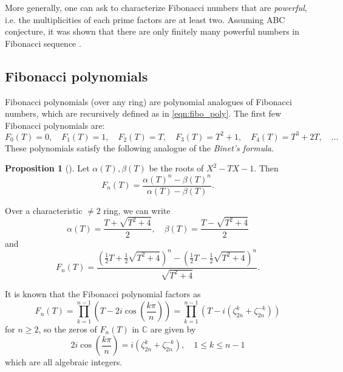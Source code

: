 \documentclass[letterpaper, 10pt]{article}
\newcommand{\bC}{\mathbb{C}}
\newcommand{\1}{\mathds{1}}	%
\theoremstyle{definition}
\newtheorem{proposition}[theorem]{Proposition}
\theoremstyle{remark}
\begin{document}
More generally, one can ask to characterize Fibonacci numbers that are \emph{powerful}, i.e. the multiplicities of each prime factors are at least two.
Assuming ABC conjecture, it was shown that there are only finitely many powerful numbers in Fibonacci sequence \cite{ribenboim1999abc,yabuta2007abc}.


\subsection{Fibonacci polynomials}
\label{subsec:prelim_fibonaccipoly}

Fibonacci polynomials (over any ring) are polynomial analogues of Fibonacci numbers, which are recursively defined as in \eqref{eqn:fibo_poly}.
The first few Fibonacci polynomials are:
\[
F_0(T) = 0, \quad F_1(T) = 1, \quad F_2(T) = T, \quad F_3(T) = T^2 + 1, \quad F_4(T) = T^3 + 2T, \quad\dots
\]
These polynomials satisfy the following analogue of the \emph{Binet's formula}.
\begin{proposition}[{\cite[Lemma 3.1]{kitayama2017irreducibility}}]
    Let $\alpha(T), \beta(T)$ be the roots of $X^2 - TX - 1$.
    Then
    \begin{equation}
    \label{eqn:FnBinet}
        F_n(T) = \frac{\alpha(T)^n - \beta(T)^n}{\alpha(T) - \beta(T)}.
    \end{equation}
\end{proposition}

Over a characteristic $\ne 2$ ring, we can write
    \[
        \alpha(T) = \frac{T + \sqrt{T^2 + 4}}{2}, \quad \beta(T) = \frac{T - \sqrt{T^2 + 4}}{2}
    \]
    and
    \begin{equation}
    \label{eqn:FnBinet2}
        F_{n}(T) = \frac{\left(\frac{1}{2}T + \frac{1}{2}\sqrt{T^2 + 4}\right)^{n} - \left(\frac{1}{2}T - \frac{1}{2}\sqrt{T^2 + 4}\right)^{n}}{\sqrt{T^2 + 4}} \text{.}
    \end{equation}

It is known that the Fibonacci polynomial factors as \cite[p. 478]{koshy}
\begin{equation}
    \label{eqn:fibo_factor}
    F_n(T) = \prod_{k=1}^{n-1} \left(T - 2 i \cos \left(\frac{k\pi}{n}\right)\right) = \prod_{k=1}^{n-1} (T - i (\zeta_{2n}^{k} + \zeta_{2n}^{-k}))
\end{equation}
for $n \ge 2$, so the zeros of $F_n(T)$ in $\bC$ are given by
\begin{equation}
\label{eqn:fibo_zeros}
2i \cos \left(\frac{k\pi}{n}\right) = i(\zeta_{2n}^{k} + \zeta_{2n}^{-k}), \quad 1 \le k \le n - 1
\end{equation}
which are all algebraic integers.
\end{document}
